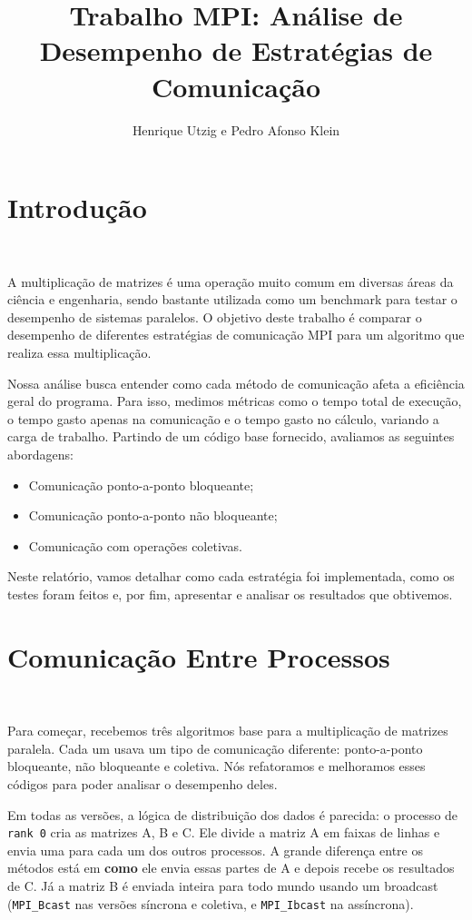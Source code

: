 \documentclass{article}
\title{Trabalho MPI: Análise de Desempenho de Estratégias de Comunicação}
\author{Henrique Utzig e Pedro Afonso Klein}
\begin{document}
\maketitle

\section{Introdução}
\

A multiplicação de matrizes é uma operação muito comum em diversas áreas da ciência e engenharia, sendo bastante utilizada como um benchmark para testar o desempenho de sistemas paralelos. O objetivo deste trabalho é comparar o desempenho de diferentes estratégias de comunicação MPI para um algoritmo que realiza essa multiplicação.

Nossa análise busca entender como cada método de comunicação afeta a eficiência geral do programa. Para isso, medimos métricas como o tempo total de execução, o tempo gasto apenas na comunicação e o tempo gasto no cálculo, variando a carga de trabalho. Partindo de um código base fornecido, avaliamos as seguintes abordagens:

\begin{itemize}
    \item Comunicação ponto-a-ponto bloqueante;
    \item Comunicação ponto-a-ponto não bloqueante;
    \item Comunicação com operações coletivas.
\end{itemize}

Neste relatório, vamos detalhar como cada estratégia foi implementada, como os testes foram feitos e, por fim, apresentar e analisar os resultados que obtivemos.

\section{Comunicação Entre Processos}
\

Para começar, recebemos três algoritmos base para a multiplicação de matrizes paralela. Cada um usava um tipo de comunicação diferente: ponto-a-ponto bloqueante, não bloqueante e coletiva. Nós refatoramos e melhoramos esses códigos para poder analisar o desempenho deles.

Em todas as versões, a lógica de distribuição dos dados é parecida: o processo de \texttt{rank 0} cria as matrizes A, B e C. Ele divide a matriz A em faixas de linhas e envia uma para cada um dos outros processos. A grande diferença entre os métodos está em \textbf{como} ele envia essas partes de A e depois recebe os resultados de C. Já a matriz B é enviada inteira para todo mundo usando um broadcast (\texttt{MPI\_Bcast} nas versões síncrona e coletiva, e \texttt{MPI\_Ibcast} na assíncrona).
\end{document}
